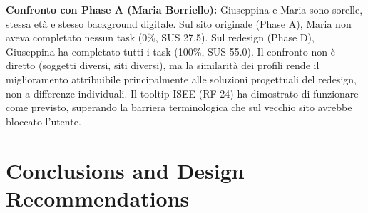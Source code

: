 \documentclass[11pt,a4paper]{article}
\begin{document}
\begin{tcolorbox}[colback=sectionBg,colframe=primaryColor,arc=2mm]
\vspace{0.2cm}
\noindent\textbf{Confronto con Phase A (Maria Borriello):}
Giuseppina e Maria sono sorelle, stessa et\`a e stesso background digitale. Sul sito originale (Phase A), Maria non aveva completato nessun task (0\%, SUS 27.5). Sul redesign (Phase D), Giuseppina ha completato tutti i task (100\%, SUS 55.0). Il confronto non \`e diretto (soggetti diversi, siti diversi), ma la similarit\`a dei profili rende il miglioramento attribuibile principalmente alle soluzioni progettuali del redesign, non a differenze individuali. Il tooltip ISEE (RF-24) ha dimostrato di funzionare come previsto, superando la barriera terminologica che sul vecchio sito avrebbe bloccato l'utente.

\end{tcolorbox}

\vspace{0.5cm}

\section{Conclusions and Design Recommendations}
\end{document}
